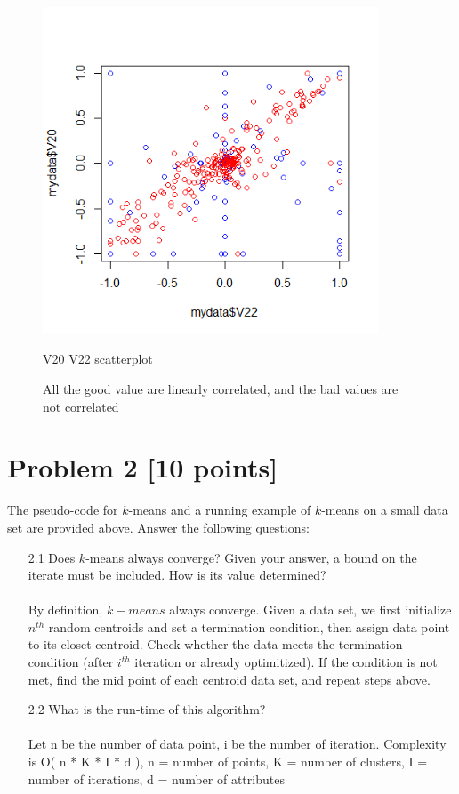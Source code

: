 \documentclass{article}
\begin{document}
\begin{enumerate}
\begin{figure}
  \includegraphics[width=100mm, scale = 0.5]{scatterplotV2022.png}
  \caption{V20 V22 scatterplot}
  \caption*{All the good value are linearly correlated, and the bad values are not correlated}
\end{figure}
\end{enumerate}

\section*{Problem 2 [10 points]} 

The pseudo-code for $k$-means and a running example of $k$-means on a small data set are provided above. Answer the following questions:

\begin{enumerate}
  \item[2.1] Does $k$-means always converge? Given your answer, a bound on the iterate must be included. How is
its value determined?
\paragraph{}
By definition, $k-means$ always converge. Given a data set, we first initialize $n^{th}$ random centroids and set a termination condition, then assign data point to its closet centroid. Check whether the data meets the termination condition (after $i^{th}$ iteration or already optimitized). If the condition is not met, find the mid point of each centroid data set, and repeat steps above.
  \item[2.2] What is the run-time of this algorithm?
\paragraph{}
Let n be the number of data point, i be the number of iteration. Complexity is O( n * K * I * d ), n = number of points, K = number of clusters, I = number of iterations, d = number of attributes
\end{enumerate}
\end{document}

